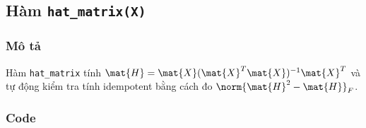 \subsection{Hàm \texttt{hat\_matrix(X)}}


\subsubsection{Mô tả}

Hàm \texttt{hat\_matrix} tính $\mat{H} = \mat{X}(\mat{X}^T\mat{X})^{-1}\mat{X}^T$
và tự động kiểm tra tính idempotent bằng cách đo $\norm{\mat{H}^2 - \mat{H}}_F$.

\subsubsection{Code}

